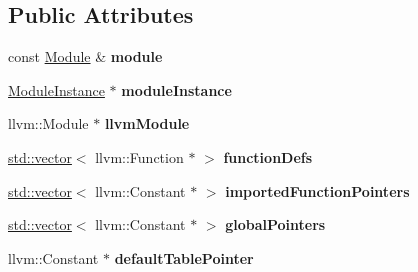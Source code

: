 \subsection*{Public Attributes}
\begin{DoxyCompactItemize}
\item 
\mbox{\label{struct_l_l_v_m_j_i_t_1_1_emit_module_context_a5d85e35c79a8d6027674c95802efc05e}} 
const \mbox{\hyperlink{struct_i_r_1_1_module}{Module}} \& {\bfseries module}
\item 
\mbox{\label{struct_l_l_v_m_j_i_t_1_1_emit_module_context_a537c38c1b4f37c287d6343aae3ee8292}} 
\mbox{\hyperlink{struct_runtime_1_1_module_instance}{Module\+Instance}} $\ast$ {\bfseries module\+Instance}
\item 
\mbox{\label{struct_l_l_v_m_j_i_t_1_1_emit_module_context_a078df3bbc564d5319de5eb8509e38de3}} 
llvm\+::\+Module $\ast$ {\bfseries llvm\+Module}
\item 
\mbox{\label{struct_l_l_v_m_j_i_t_1_1_emit_module_context_ab5839ad47aa2ecdb0aecfc90e1bea4e1}} 
\mbox{\hyperlink{classstd_1_1vector}{std\+::vector}}$<$ llvm\+::\+Function $\ast$ $>$ {\bfseries function\+Defs}
\item 
\mbox{\label{struct_l_l_v_m_j_i_t_1_1_emit_module_context_a0555c2f4e48791d8f6b0e90f71171f64}} 
\mbox{\hyperlink{classstd_1_1vector}{std\+::vector}}$<$ llvm\+::\+Constant $\ast$ $>$ {\bfseries imported\+Function\+Pointers}
\item 
\mbox{\label{struct_l_l_v_m_j_i_t_1_1_emit_module_context_a95d2cb94366a910114c4ce9564b16ab7}} 
\mbox{\hyperlink{classstd_1_1vector}{std\+::vector}}$<$ llvm\+::\+Constant $\ast$ $>$ {\bfseries global\+Pointers}
\item 
\mbox{\label{struct_l_l_v_m_j_i_t_1_1_emit_module_context_a86a6282ea145d0a5b5517489c84d56ec}} 
llvm\+::\+Constant $\ast$ {\bfseries default\+Table\+Pointer}
\item 
\mbox{\label{struct_l_l_v_m_j_i_t_1_1_emit_module_context_a5d8c52f4dbb3b3ca3439caa5ee6c863b}} 

\end{DoxyCompactItemize}
